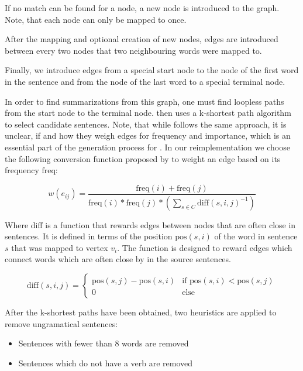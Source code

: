 \documentclass[a4paper,BCOR=10mm]{report}
\begin{document}
If no match can be found for a node, a new node is introduced to the graph. Note, that each node can only be mapped to once.

After the mapping and optional creation of new nodes, edges are introduced between every two nodes that two neighbouring words were mapped to.

Finally, we introduce edges from a special start node to the node of the first word in the sentence and from the node of the last word to a special terminal node.

In order to find summarizations from this graph, one must find loopless paths from the start node to the terminal node. \citeauthor{fillipova} then uses a k-shortest path algorithm to select candidate sentences. Note, that while \citeauthor{banerjee} follows the same approach, it is unclear, if and how they weigh edges for frequency and importance, which is an essential part of the generation process for \citeauthor{fillipova}.
In our reimplementation we choose the following conversion function proposed by \citeauthor{fillipova} to weight an edge based on its frequency $\text{freq}$:

\begin{displaymath}
w(e_{ij}) = \frac{\text{freq}(i) + \text{freq}(j)} {\text{freq}(i) * \text{freq}(j) * (\sum_{s \in C} \text{diff}(s, i, j)^{-1})}
\end{displaymath}

Where diff is a function that rewards edges between nodes that are often close in sentences. It is defined in terms of the position $\text{pos}(s, i)$ of the word in sentence $s$ that was mapped to vertex $v_i$.
The function is designed to reward edges which connect words which are often close by in the source sentences.

\begin{displaymath}
\text{diff}(s, i, j) = \begin{cases}
\text{pos}(s, j) - \text{pos}(s, i) & \text{if }\text{pos}(s, i) < \text{pos}(s, j) \\
0 & \text{else}
\end{cases}
\end{displaymath}

After the k-shortest paths have been obtained, two heuristics are applied to remove ungramatical sentences:

\begin{itemize}
    \item {Sentences with fewer than $8$ words are removed}
    \item {Sentences which do not have a verb  are removed}
\end{itemize}
\end{document}
